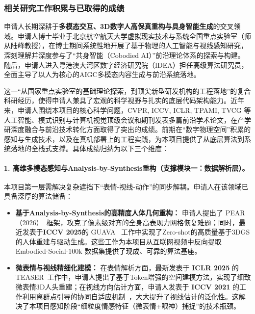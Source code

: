 \subsubsection{相关研究工作积累与已取得的成绩}


申请人长期深耕于\textbf{多模态交互、3D数字人高保真重构与具身智能生成}的交叉领域。申请人博士毕业于北京航空航天大学虚拟现实技术与系统全国重点实验室（师从陆峰教授），在博士期间系统性地开展了基于物理的人工智能与视线感知研究，深刻理解并深度参与了“共身智能（Cobodied AI）”前沿理论体系的探索与构建。随后，申请人进入粤港澳大湾区数字经济研究院（IDEA）担任高级算法研究员，全面主导了以人为核心的AIGC多模态内容生成与前沿系统落地。

这一“从国家重点实验室的基础理论探索，到顶尖新型研发机构的工程落地”的复合科研经历，使得申请人兼具了宏观的科学视野与扎实的底层代码架构能力。近年来，申请人围绕本项目的核心科学问题，CVPR, ICCV, ICLR, TPAMI, TVCG 等人工智能、模式识别与计算机视觉顶级会议和期刊发表多篇前沿学术论文，在产学研深度融合与前沿技术转化方面取得了突出的成绩。前期在“数字物理空间”积累的感知与生成技术，以及在真机部署上的工程实践，为本项目提供了从底层算法到系统落地的全栈式支撑。具体成绩归纳为以下三个维度：


\paragraph{\textbf{1. 高维多模态感知与Analysis-by-Synthesis重构（支撑模块一：数据解析层）。}}
本项目第一层需解决复杂遮挡下“表情-视线-动作”的同步解耦。申请人在该领域已具备深厚的算法储备：
\begin{itemize}
    \item \textbf{基于Analysis-by-Synthesis的高精度人体几何重构：} 申请人提出了 PEAR （2026）~\cite{wu2026pear}框架，攻克了像素级对齐的全身高表现力网格恢复难题；同时，最近发表于\textbf{ICCV 2025}的 GUAVA~\cite{GUAVA} 工作中实现了Zero-shot的高质量基于3DGS的人体重建与驱动生成。这些工作为本项目从互联网视频中反向提取 Embodied-Social-100k 数据集提供了现成、可靠的算法基座。
    \item \textbf{微表情与视线精细化建模：} 在表情解析方面，最新发表于 \textbf{ICLR 2025} 的TEASER~\cite{liu2025TEASER}工作中，申请人提出了基于Token增强的空间建模方法，实现了细致微表情3D人头重建；在视线方向估计方面，申请人发表于 \textbf{ICCV 2021} 的工作利用离群点引导的协同自适应机制~\cite{liu2021PnP_GA}，大大提升了视线估计的泛化性。这解决了本项目感知阶段“细粒度情感特征（微表情+眼神）捕捉”的技术瓶颈。
\end{itemize}

